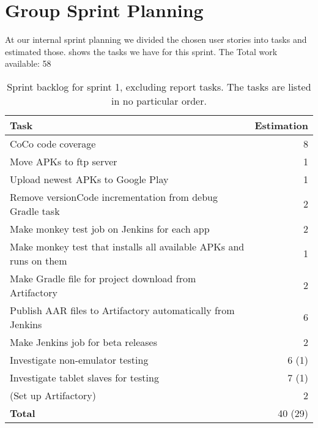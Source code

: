 \section{Group Sprint Planning}
At our internal sprint planning we divided the chosen user stories into tasks and estimated those.  shows the tasks we have for this sprint. The 
Total work available: 58

\begin{table}[htp]%
  \centering
  \begin{tabular}{lr}
    \toprule
    \textbf{Task} & \textbf{Estimation} \\
    \midrule
    CoCo code coverage & 8 \\
    Move APKs to ftp server & 1 \\
    Upload newest APKs to Google Play & 1 \\
    Remove versionCode incrementation from debug Gradle task & 2 \\
    Make monkey test job on Jenkins for each app & 2 \\
    Make monkey test that installs all available APKs and runs on them & 1 \\
    Make Gradle file for project download from Artifactory & 2 \\
    Publish AAR files to Artifactory automatically from Jenkins & 6 \\
    Make Jenkins job for beta releases & 2 \\
    Investigate non-emulator testing & 6 (1) \\
    Investigate tablet slaves for testing & 7 (1) \\
    (Set up Artifactory) & 2 \\
    \midrule
    \textbf{Total} & 40 (29) \\
    \bottomrule
  \end{tabular}
\caption{Sprint backlog for sprint 1, excluding report tasks. The tasks are listed in no particular order.}
\label{tab:sprint1_tasks}
\end{table}




